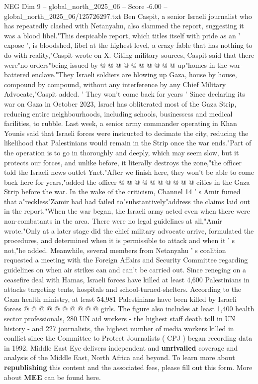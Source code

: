 \begin{textsample}{NEG Dim 9 – global\_north\_2025\_06 – Score -6.00 – global\_north\_2025\_06/125726297.txt}
Ben Caspit, a senior Israeli journalist who has repeatedly clashed with Netanyahu, also slammed the report, suggesting it was a blood libel."This despicable report, which titles itself with pride as an ' expose ', is bloodshed, libel at the highest level, a crazy fable that has nothing to do with reality,"Caspit wrote on X.
Citing military sources, Caspit said that there were"no orders"being issued by @ @ @ @ @ @ @ @ @ @ up"homes in the war-battered enclave."They Israeli soldiers are blowing up Gaza, house by house, compound by compound, without any interference by any Chief Military Advocate,"Caspit added. ' They won't come back for years ' Since declaring its war on Gaza in October 2023, Israel has obliterated most of the Gaza Strip, reducing entire neighbourhoods, including schools, businessess and medical facilities, to rubble.
Last week, a senior army commander operating in Khan Younis said that Israeli forces were instructed to decimate the city, reducing the likelihood that Palestinians would remain in the Strip once the war ends."Part of the operation is to go in thoroughly and deeply, which may seem slow, but it protects our forces, and unlike before, it literally destroys the zone,"the officer told the Israeli news outlet Ynet."After we finish here, they won't be able to come back here for years,"added the officer @ @ @ @ @ @ @ @ @ @ cities in the Gaza Strip before the war.
In the wake of the criticism, Channel 14 ' s Amir fumed that a"reckless"Zamir had had failed to"substantively"address the claims laid out in the report."When the war began, the Israeli army acted even when there were non-combatants in the area.
There were no legal guidelines at all,"Amir wrote."Only at a later stage did the chief military advocate arrive, formulated the procedures, and determined when it is permissible to attack and when it ' s not,"he added.
Meanwhile, several members from Netanyahu ' s coalition requested a meeting with the Foreign Affairs and Security Committee regarding guidelines on when air strikes can and can't be carried out.
Since reneging on a ceasefire deal with Hamas, Israeli forces have killed at least 4,600 Palestinians in attacks targeting tents, hospitals and school-turned-shelters.
According to the Gaza health ministry, at least 54,981 Palestinians have been killed by Israeli forces @ @ @ @ @ @ @ @ @ @ girls.
The figure also includes at least 1,400 health sector professionals, 280 UN aid workers - the highest staff death toll in UN history - and 227 journalists, the highest number of media workers killed in conflict since the Committee to Protect Journalists ( CPJ ) began recording data in 1992.
Middle East Eye delivers independent and \textbf{unrivalled} coverage and analysis of the Middle East, North Africa and beyond.
To learn more about \textbf{republishing} this content and the associated fees, please fill out this form.
More about \textbf{MEE} can be found here.

\end{textsample}
